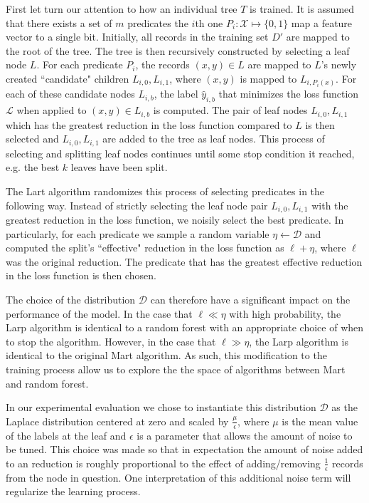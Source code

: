 \documentclass{article} %
\begin{document}
First let turn our attention to how an individual tree $T$ is trained. It is assumed that there exists a set of $m$ predicates the $i$th one $P_i:\mathcal{X} \mapsto \{0,1\}$ map a feature vector to a single bit.  Initially, all records in the training set $D'$ are mapped to the root of the tree. The tree is then recursively constructed by selecting a leaf node $L$. For each predicate $P_i$, the records $(x,y)\in L$ are mapped to $L$'s newly created ``candidate" children $L_{i,0},L_{i,1}$, where $(x,y)$ is mapped to $L_{i,P_i(x)}$. For each of these candidate nodes $L_{i,b}$, the label $\hat{y}_{i,b}$ that minimizes the loss function $\mathcal{L}$ when applied to $(x,y)\in L_{i,b}$ is computed. The pair of leaf nodes $L_{i,0}, L_{i,1}$ which has the greatest reduction in the loss function compared to $L$ is then selected and $L_{i,0}, L_{i,1}$ are added to the tree as leaf nodes. This process of selecting and splitting leaf nodes continues until some stop condition it reached, e.g. the best $k$ leaves have been split.

The Lart algorithm randomizes this process of selecting predicates in the following way. Instead of strictly selecting the leaf node pair $L_{i,0}, L_{i,1}$ with the greatest reduction in the loss function, we noisily select the best predicate. In particularly, for each predicate we sample a random variable $\eta\gets \mathcal{D}$ and computed the split's ``effective" reduction in the loss function as $\ell + \eta$, where $\ell$ was the original reduction. The predicate that has the greatest effective reduction in the loss function is then chosen.

The choice of the distribution $\mathcal{D}$ can therefore have a significant impact on the performance of the model. In the case that $\ell \ll \eta$ with high probability,  the Larp algorithm is identical to a random forest with an appropriate choice of when to stop the algorithm. However, in the case that $\ell \gg \eta$, the Larp algorithm is identical to the original Mart algorithm. As such, this modification to the training process allow us to explore the the space of algorithms between Mart and random forest.

In our experimental evaluation we chose to instantiate this distribution $\mathcal{D}$ as the Laplace distribution centered at zero and scaled by $\frac{\mu}{\epsilon}$, where $\mu$ is the mean value of the labels at the leaf and $\epsilon$ is a parameter that allows the amount of noise to be tuned. This choice was made so that in expectation the amount of noise added to an reduction is roughly proportional to the effect of adding/removing $\frac{1}{\epsilon}$ records from the node in question. One interpretation of this additional noise term will regularize the learning process.
\end{document}
